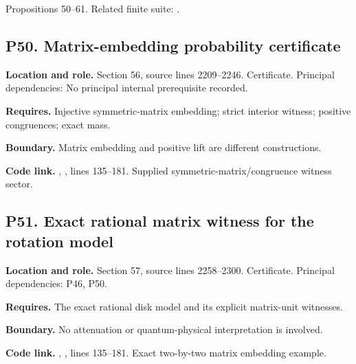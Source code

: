 \documentclass[11pt,oneside,openany]{book}
\numberwithin{equation}{section}
\begin{document}
Propositions 50--61. Related finite suite:
.

\par\noindent\begin{minipage}{\textwidth}
\subsection{P50. Matrix-embedding probability
certificate}\label{LSMRegister:p50.-matrix-embedding-probability-certificate}

\textbf{Location and role.} Section 56, source lines 2209--2246.
Certificate. Principal dependencies: No principal internal prerequisite
recorded.

\textbf{Requires.} Injective symmetric-matrix embedding; strict interior
witness; positive congruences; exact mass.

\textbf{Boundary.} Matrix embedding and positive lift are different
constructions.

\textbf{Code link.} ,
, lines 135--181. Supplied
symmetric-matrix/congruence witness sector.
\end{minipage}\par\medskip

\par\noindent\begin{minipage}{\textwidth}
\subsection{P51. Exact rational matrix witness for the rotation
model}\label{LSMRegister:p51.-exact-rational-matrix-witness-for-the-rotation-model}

\textbf{Location and role.} Section 57, source lines 2258--2300.
Certificate. Principal dependencies: P46, P50.

\textbf{Requires.} The exact rational disk model and its explicit
matrix-unit witnesses.

\textbf{Boundary.} No attenuation or quantum-physical interpretation is
involved.

\textbf{Code link.} ,
, lines 135--181. Exact two-by-two matrix
embedding example.
\end{minipage}\par\medskip
\end{document}
